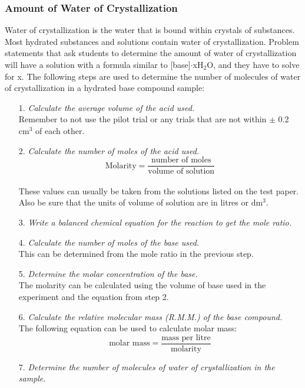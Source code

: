 \subsubsection{Amount of Water of Crystallization}

Water of crystallization is the water that is bound within crystals of substances. Most hydrated substances and solutions contain water of crystallization. Problem statements that ask students to determine the amount of water of crystallization will have a solution with a formula similar to [base]$\cdot$xH$_2$O, and they have to solve for x. The following steps are used to determine the number of molecules of water of crystallization in a hydrated base compound sample:

\begin{enumerate}
\item[1.] \textit{Calculate the average volume of the acid used.}\\
Remember to not use the pilot trial or any trials that are not within $\pm$ 0.2 cm$^3$ of each other.
\item[2.] \textit{Calculate the number of moles of the acid used.}\\
$$\text{Molarity} = \frac{\text{number of moles}}{\text{volume of solution}}$$\\
These values can usually be taken from the solutions listed on the test paper. Also be sure that the units of volume of solution are in litres or dm$^3$.
\item[3.] \textit{Write a balanced chemical equation for the reaction to get the mole ratio.}
\item[4.] \textit{Calculate the number of moles of the base used.}\\
This can be determined from the mole ratio in the previous step.
\item[5.] \textit{Determine the molar concentration of the base.}\\
The molarity can be calculated using the volume of base used in the experiment and the equation from step 2.
\item[6.] \textit{Calculate the relative molecular mass (R.M.M.) of the base compound.}\\
The following equation can be used to calculate molar mass:\\
$$\text{molar mass} = \frac{\text{mass per litre}}{\text{molarity}}$$
\item[7.] \textit{Determine the number of molecules of water of crystallization in the sample.}\\

\end{enumerate}
